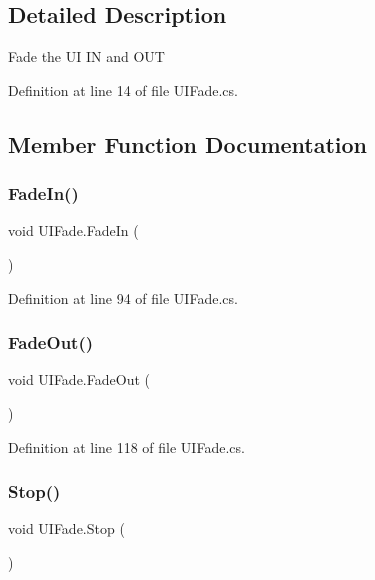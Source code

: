 \subsection{Detailed Description}
Fade the UI IN and O\+UT 



Definition at line 14 of file U\+I\+Fade.\+cs.



\subsection{Member Function Documentation}
\mbox{\label{class_u_i_fade_ad9991d96579a20faaa7a93c50d5f38e1}} 
\subsubsection{\texorpdfstring{Fade\+In()}{FadeIn()}}
{\footnotesize\ttfamily void U\+I\+Fade.\+Fade\+In (\begin{DoxyParamCaption}{ }\end{DoxyParamCaption})}



Definition at line 94 of file U\+I\+Fade.\+cs.

\mbox{\label{class_u_i_fade_ae98897fd279c593f1dfea85829752c62}} 
\subsubsection{\texorpdfstring{Fade\+Out()}{FadeOut()}}
{\footnotesize\ttfamily void U\+I\+Fade.\+Fade\+Out (\begin{DoxyParamCaption}{ }\end{DoxyParamCaption})}



Definition at line 118 of file U\+I\+Fade.\+cs.

\mbox{\label{class_u_i_fade_a6282aba084e3275d93fbe910e32a9e49}} 
\subsubsection{\texorpdfstring{Stop()}{Stop()}}
{\footnotesize\ttfamily void U\+I\+Fade.\+Stop (\begin{DoxyParamCaption}{ }\end{DoxyParamCaption})}



